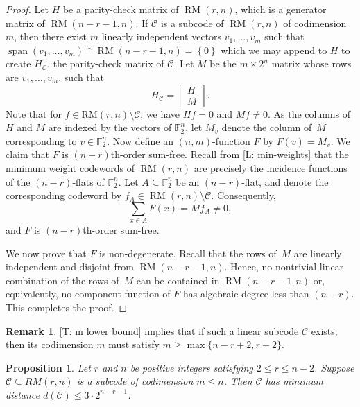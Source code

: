 \documentclass[12pt]{article}
\newtheorem{prop}[thm]{Proposition}
\theoremstyle{definition}
\newtheorem*{remark}{Remark}
\newcommand{\F}{\mathbb F}
\newcommand{\Fpnv}{\mathbb{F}_2^n}
\newcommand{\set}[1]{\left\{#1\right\}}
\DeclareMathOperator{\RM}{RM}
\DeclareMathOperator{\spann}{span}
\begin{document}
\begin{proof}
    Let $H$ be a parity-check matrix of $\RM(r,n)$, which is a generator matrix of $\RM(n-r-1,n)$. If $\mathcal{C}$ is a subcode of $\RM(r,n)$ of codimension $m$, then there exist $m$ linearly independent vectors $v_1, \dots, v_m$ such that $\spann(v_1,\dots,v_m) \cap \RM(n-r-1,n) = \set{0}$ which we may append to $H$ to create $H_\mathcal{C}$, the parity-check matrix of $\mathcal{C}$. 
    Let $M$ be the $m \times 2^n$ matrix whose rows are $v_1, \dots, v_m$, such that
    \[
    H_\mathcal{C} = \begin{bmatrix} 
    H \\ 
    M
    \end{bmatrix}.
    \]
    Note that for $f\in \text{RM}(r, n) \setminus \mathcal{C}$, we have $Hf=0$ and $Mf \neq 0$. As the columns of $H$ and $M$ are indexed by the vectors of $\F_{2}^n$, let $M_v$ denote the column of~$M$ corresponding to $v \in \F_2^n$. Now define an $(n,m)$-function $F$ by $F(v) = M_v$. We claim that $F$ is $(n-r)$th-order sum-free. Recall from \cref{L: min-weights} that the minimum weight codewords of $\RM(r,n)$ are precisely the incidence functions of the $(n-r)$-flats of $\Fpnv$. Let $A \subseteq \F_2^n$ be an $(n-r)$-flat, and denote the corresponding codeword by $f_A \in \RM(r,n)\setminus\mathcal{C}$.  Consequently, 
    \[
    \sum _{x \in A} F(x)  = Mf_A \neq 0,
    \]
    and $F$ is $(n-r)$th-order sum-free.

    We now prove that $F$ is non-degenerate. Recall that the rows of~$M$ are linearly independent and disjoint from $\RM(n-r-1,n)$. Hence, no nontrivial linear combination of the rows of~$M$ can be contained in $\RM(n-r-1,n)$ or, equivalently, no component function of $F$ has algebraic degree less than $(n-r)$. This completes the proof.
\end{proof}

\begin{remark} 
\cref{T: m lower bound} implies that if such a linear subcode $\mathcal{C}$ exists, then its codimension $m$ must satisfy  $m \geq \max\{n-r+2, r+2\}$.
\end{remark}



\begin{prop}\label{P: Code bound}
    Let $r$ and $n$ be positive integers satisfying $2 \leq r \leq n-2$. Suppose $\mathcal{C}\subseteq RM(r, n)$ is a subcode of codimension $m \leq n$. Then $\mathcal{C}$ has minimum distance $d(\mathcal{C}) \leq 3\cdot 2^{n - r -1}$. 
\end{prop}
\end{document}
